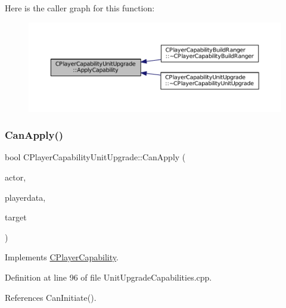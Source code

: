 Here is the caller graph for this function\+:\nopagebreak
\begin{figure}[H]
\begin{center}
\leavevmode
\includegraphics[width=350pt]{classCPlayerCapabilityUnitUpgrade_a8cc6fee17dd178fd798e36c3d5301e9d_icgraph}
\end{center}
\end{figure}
\hypertarget{classCPlayerCapabilityUnitUpgrade_a93d1a57f2cc52b90ce6cb714717bfefd}{}\label{classCPlayerCapabilityUnitUpgrade_a93d1a57f2cc52b90ce6cb714717bfefd} 
\subsubsection{\texorpdfstring{Can\+Apply()}{CanApply()}}
{\footnotesize\ttfamily bool C\+Player\+Capability\+Unit\+Upgrade\+::\+Can\+Apply (\begin{DoxyParamCaption}\item[{std\+::shared\+\_\+ptr$<$ \hyperlink{classCPlayerAsset}{C\+Player\+Asset} $>$}]{actor,  }\item[{std\+::shared\+\_\+ptr$<$ \hyperlink{classCPlayerData}{C\+Player\+Data} $>$}]{playerdata,  }\item[{std\+::shared\+\_\+ptr$<$ \hyperlink{classCPlayerAsset}{C\+Player\+Asset} $>$}]{target }\end{DoxyParamCaption})\hspace{0.3cm}{\ttfamily [virtual]}}



Implements \hyperlink{classCPlayerCapability_ae96263e0950f496492f8baeb877b9554}{C\+Player\+Capability}.



Definition at line 96 of file Unit\+Upgrade\+Capabilities.\+cpp.



References Can\+Initiate().



